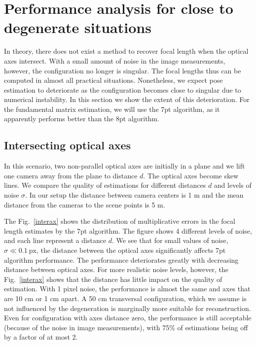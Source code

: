 \section{Performance analysis for close to degenerate situations}

In theory, there does not exist a method to recover focal length when the optical axes intersect. With a small amount of noise in the image measurements, however, the configuration no longer is singular. The focal lengths  thus can be computed in almost all practical situations. Nonetheless, we expect pose estimation to deteriorate as the configuration becomes close to singular due to numerical instability. In this section we show the extent of this deterioration.  For the fundamental matrix estimation, we will use the 7pt algorithm, as it apparently performs better than the 8pt algorithm.

\subsection{Intersecting optical axes} 

In this scenario, two non-parallel optical axes are initially in a plane and we lift one camera away from the plane to distance $d$. The optical axes become skew lines. We compare the quality of estimations for different distances $d$ and levels of noise $\sigma$.
In our setup the distance between camera centers is 1 m and the mean distance from the cameras to the scene points is 5 m. 

The Fig.~\ref{interax} shows the distribution of multiplicative errors in the focal length estimates by the 7pt algorithm. The figure shows 4 different levels of noise, and each line represent a distance $d$. We see that for small values of noise, $\sigma \ll 0.1~\text{px}$, the distance between the optical axes significantly affects 7pt algorithm performance.
The performance  deteriorates greatly with decreasing distance between optical axes. For more realistic noise levels, however, the Fig.~\ref{interax} shows that the distance has little impact on the quality of estimation. With 1 pixel noise, the performance is almost the same and axes that are 10 cm or 1 cm apart. A 50 cm transversal configuration, which we assume is not influenced by the degeneration is marginally more suitable for reconstruction. Even for configuration with axes distance zero, the performance is still acceptable (because of the noise in image measurements), with 75\% of estimations being off by a factor of at most 2. 

